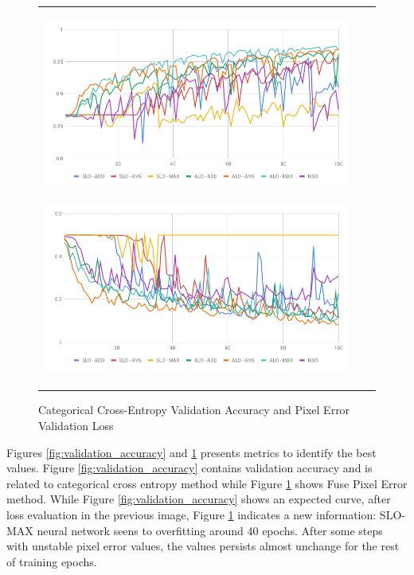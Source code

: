 \begin{figure}
  \caption{Categorical Cross-Entropy Validation Accuracy and Pixel Error Validation Loss}
  \centering
  \begin{tabular}{lll}
    \includegraphics[width=1.\columnwidth]{figures/falreis/validation_accuracy.png}
    \label{fig:validation_accuracy}
    
    \includegraphics[width=1.\columnwidth]{figures/falreis/pixel_error.png}
    \label{fig:pixel_error}
  \end{tabular}
\end{figure}

Figures \ref{fig:validation_accuracy} and \ref{fig:pixel_error} presents metrics to identify the best values. Figure \ref{fig:validation_accuracy} contains validation accuracy and is related to categorical cross entropy method while Figure \ref{fig:pixel_error} shows Fuse Pixel Error method. While Figure \ref{fig:validation_accuracy} shows an expected curve, after loss evaluation in the previous image, Figure \ref{fig:pixel_error} indicates a new information: SLO-MAX neural network seens to overfitting around 40 epochs. After some steps with unstable pixel error values, the values persists almost unchange for the rest of training epochs. 

